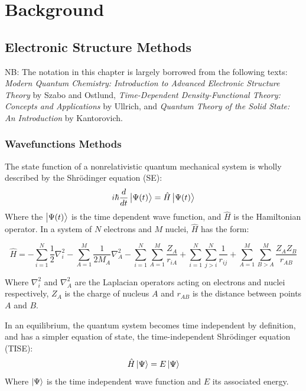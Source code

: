 \part{Background}
\chapter{Electronic Structure Methods} %

\label{chap:meth}

NB: The notation in this chapter is largely borrowed from the following texts: \textit{Modern Quantum Chemistry: Introduction to Advanced Electronic Structure Theory} by Szabo and Ostlund,\cite{Szabo} \textit{Time-Dependent Density-Functional Theory: Concepts and Applications} by Ullrich,\cite{Ullrich} and \textit{Quantum Theory of the Solid State: An Introduction} by Kantorovich.\cite{Kantorovich2004}


\section{Wavefunctions Methods}

The state function of a nonrelativistic quantum mechanical system is wholly described by the Shr\"{o}dinger equation (SE):
\begin{equation}
    i\hbar \frac{d}{dt} \ket{\Psi(t)} = \hat{H} \ket{\Psi(t)}
    \label{eq:tdse}
\end{equation}
Where the $\ket{\Psi(t)}$ is the time dependent wave function, and $\hat{H}$ is the Hamiltonian operator. In a system of $N$ electrons and $M$ nuclei, $\hat{H}$ has the form:

\begin{equation}
    \hat{H} = - \sum_{i=1}^N \frac{1}{2} \nabla^2_i
              - \sum_{A=1}^M \frac{1}{2M_A} \nabla^2_A
              - \sum_{i=1}^N \sum_{A=1}^M \frac{Z_A}{r_{iA}}
              + \sum_{i=1}^N \sum_{j>i}^N \frac{1}{r_{ij}}
              + \sum_{A=1}^M \sum_{B>A}^M \frac{Z_AZ_B}{r_{AB}}
    \label{eq:full_hamilton}
\end{equation}

Where $\nabla^2_i$ and $\nabla^2_A$ are the Laplacian operators acting on electrons and nuclei respectively, $Z_A$ is the charge of nucleus $A$ and $r_{AB}$ is the distance between points $A$ and $B$.

In an equilibrium, the quantum system becomes time independent by definition, and has a simpler equation of state, the  time-independent Shr\"{o}dinger equation (TISE):\cite{Schrodinger1926}
\begin{equation}
    \hat{H} \ket{\Psi} =  E \ket{\Psi}
    \label{eq:tise}
\end{equation}
Where $\ket{\Psi}$ is the time independent wave function and $E$ its associated energy.

